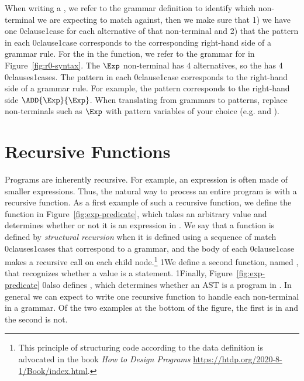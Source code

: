 \documentclass[7x10,nocrop]{TimesAPriori_MIT}%
\def\racketEd{0}
\def\pythonEd{1}
\def\edition{1}
\newcommand{\racket}[1]{{\if\edition\racketEd{#1}\fi}}
\newcommand{\python}[1]{{\if\edition\pythonEd #1\fi}}
\begin{document}
When writing a , we refer to the grammar definition to
identify which non-terminal we are expecting to match against, then we
make sure that 1) we have one \racket{clause}\python{case} for each alternative of that
non-terminal and 2) that the pattern in each \racket{clause}\python{case} corresponds to the
corresponding right-hand side of a grammar rule. For the 
in the  function, we refer to the grammar for \LangInt{} in
Figure~\ref{fig:r0-syntax}. The $\Exp$ non-terminal has 4
alternatives, so the  has 4 \racket{clauses}\python{cases}.
The pattern in each \racket{clause}\python{case} corresponds to the right-hand side
of a grammar rule. For example, the pattern  corresponds to the
right-hand side $\ADD{\Exp}{\Exp}$. When translating from grammars to
patterns, replace non-terminals such as $\Exp$ with pattern variables
of your choice (e.g.  and ).


\section{Recursive Functions}
\label{sec:recursion}

Programs are inherently recursive. For example, an expression is often
made of smaller expressions. Thus, the natural way to process an
entire program is with a recursive function.  As a first example of
such a recursive function, we define the function  in
Figure~\ref{fig:exp-predicate}, which takes an arbitrary value and
determines whether or not it is an expression in \LangInt{}.
%
We say that a function is defined by \emph{structural recursion} when
it is defined using a sequence of match \racket{clauses}\python{cases}
that correspond to a grammar, and the body of each
\racket{clause}\python{case} makes a recursive call on each child
node.\footnote{This principle of structuring code according to the
  data definition is advocated in the book \emph{How to Design
    Programs} \url{https://htdp.org/2020-8-1/Book/index.html}.}
\python{We define a second function, named , that
  recognizes whether a value is a \LangInt{} statement.}
\python{Finally, } Figure~\ref{fig:exp-predicate} \racket{also}
defines , which determines whether an AST is a program in
\LangInt{}.  In general we can expect to write one recursive function
to handle each non-terminal in a grammar. Of the two examples at the bottom of the figure, the
first is in  and the second is not.
\end{document}
